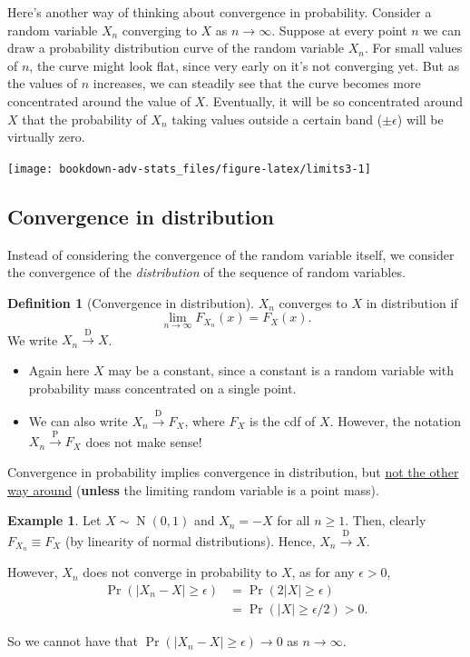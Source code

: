 \documentclass[
]{book}
\providecommand{\tightlist}{%
  \setlength{\itemsep}{0pt}\setlength{\parskip}{0pt}}
\DeclareMathOperator{\N}{N}
\theoremstyle{definition}
\newtheorem{definition}{Definition}[chapter]
\theoremstyle{definition}
\newtheorem{example}{Example}[chapter]
\theoremstyle{definition}
\theoremstyle{definition}
\theoremstyle{remark}
\begin{document}
Here's another way of thinking about convergence in probability.
Consider a random variable \(X_n\) converging to \(X\) as \(n\to\infty\).
Suppose at every point \(n\) we can draw a probability distribution curve of the random variable \(X_n\).
For small values of \(n\), the curve might look flat, since very early on it's not converging yet.
But as the values of \(n\) increases, we can steadily see that the curve becomes more concentrated around the value of \(X\).
Eventually, it will be so concentrated around \(X\) that the probability of \(X_n\) taking values outside a certain band (\(\pm\epsilon\)) will be virtually zero.

\begin{center}\texttt{[image: bookdown-adv-stats\_files/figure-latex/limits3-1]} \end{center}

\hypertarget{convergence-in-distribution}{%
\subsection{Convergence in distribution}\label{convergence-in-distribution}}

Instead of considering the convergence of the random variable itself, we consider the convergence of the \emph{distribution} of the sequence of random variables.

\begin{definition}[Convergence in distribution]
\(X_n\) converges to \(X\) in distribution if
\[\lim_{n\to\infty}F_{X_n}(x) = F_X(x).\]
We write
\(X_n\xrightarrow{\text{D}}X\).
\end{definition}

\begin{itemize}
\tightlist
\item
  Again here \(X\) may be a constant, since a constant is a random variable with probability mass concentrated on a single point.
\item
  We can also write \(X_n{\xrightarrow{\text{D}}} F_X\), where \(F_X\) is the cdf of \(X\). However, the notation \(X_n{\xrightarrow{\text{P}}} F_X\) does not make sense!
\end{itemize}

Convergence in probability implies convergence in distribution, but \uline{not the other way around} (\textbf{unless} the limiting random variable is a point mass).

\begin{example}
Let \(X\sim\N(0,1)\) and \(X_n=-X\) for all \(n \geq 1\). Then, clearly
\(F_{X_n} \equiv F_{X}\) (by linearity of normal distributions). Hence,
\(X_n\xrightarrow{\text{D}}X\).

However, \(X_n\) does not converge in probability to \(X\), as for any \(\epsilon>0\),
\[\begin{aligned}
       \Pr(|X_n-X|\geq\epsilon) &= \Pr(2|X|\geq\epsilon) \\
       &= \Pr(|X|\geq\epsilon/2) > 0.
    \end{aligned}\]

So we cannot have that \(\Pr(|X_n-X|\geq\epsilon) \to 0\) as \(n\to\infty\).
\end{example}
\end{document}
